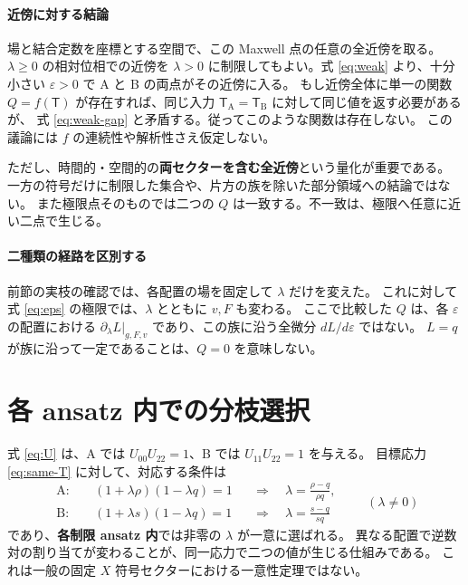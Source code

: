\documentclass[11pt,a4paper]{article}
\newcommand{\Tmix}{\mathsf T}
\begin{document}
\paragraph{近傍に対する結論}
場と結合定数を座標とする空間で、この Maxwell 点の任意の全近傍を取る。
 $\lambda\geq0$ の相対位相での近傍を $\lambda>0$ に制限してもよい。式 \eqref{eq:weak} より、十分小さい
$\varepsilon>0$ で A と B の両点がその近傍に入る。
もし近傍全体に単一の関数 $Q=f(\Tmix)$ が存在すれば、同じ入力
$\Tmix_{\mathrm A}=\Tmix_{\mathrm B}$ に対して同じ値を返す必要があるが、
式 \eqref{eq:weak-gap} と矛盾する。従ってこのような関数は存在しない。
この議論には $f$ の連続性や解析性さえ仮定しない。

ただし、時間的・空間的の\textbf{両セクターを含む全近傍}という量化が重要である。
一方の符号だけに制限した集合や、片方の族を除いた部分領域への結論ではない。
また極限点そのものでは二つの $Q$ は一致する。不一致は、極限へ任意に近い二点で生じる。

\paragraph{二種類の経路を区別する}
前節の実枝の確認では、各配置の場を固定して $\lambda$ だけを変えた。
これに対して式 \eqref{eq:eps} の極限では、$\lambda$ とともに $v,F$ も変わる。
ここで比較した $Q$ は、各 $\varepsilon$ の配置における
$\partial_\lambda L|_{g,F,v}$ であり、この族に沿う全微分 $dL/d\varepsilon$ ではない。
$L=q$ が族に沿って一定であることは、$Q=0$ を意味しない。

\section{各 ansatz 内での分枝選択}
式 \eqref{eq:U} は、A では $U_{00}U_{22}=1$、B では $U_{11}U_{22}=1$ を与える。
目標応力 \eqref{eq:same-T} に対して、対応する条件は
\begin{equation}\label{eq:pair}
\begin{aligned}
\mathrm A:&\quad(1+\lambda\rho)(1-\lambda q)=1
 &&\Longrightarrow\quad\lambda=\frac{\rho-q}{\rho q},\\
\mathrm B:&\quad(1+\lambda s)(1-\lambda q)=1
 &&\Longrightarrow\quad\lambda=\frac{s-q}{sq}
\end{aligned}\qquad(\lambda\ne0)
\end{equation}
であり、\textbf{各制限 ansatz 内}では非零の $\lambda$ が一意に選ばれる。
異なる配置で逆数対の割り当てが変わることが、同一応力で二つの値が生じる仕組みである。
これは一般の固定 $X$ 符号セクターにおける一意性定理ではない。
\end{document}
